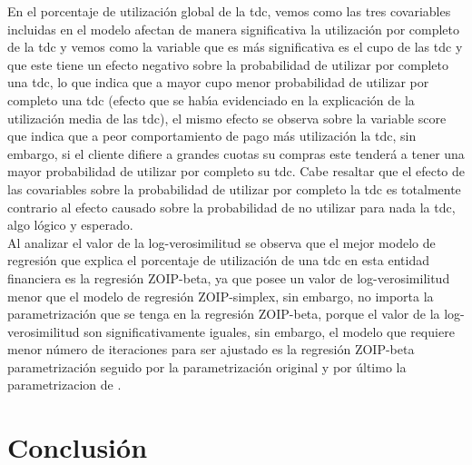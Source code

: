 En el porcentaje de utilizaci\'{o}n global de la tdc, vemos como las tres covariables incluidas en el modelo afectan de manera significativa la utilizaci\'{o}n por completo de la tdc y vemos como la variable que es m\'{a}s significativa es el cupo de las tdc y que este tiene un efecto negativo sobre la probabilidad de utilizar por completo una tdc, lo que indica que a mayor cupo menor probabilidad de utilizar por completo una tdc (efecto que se hab\'{\i}a evidenciado en la explicaci\'{o}n de la utilizaci\'{o}n media de las tdc), el mismo efecto se observa sobre la variable score que indica que a peor comportamiento de pago m\'{a}s utilizaci\'{o}n la tdc, sin embargo, si el cliente difiere a grandes cuotas su compras este tender\'{a} a tener una mayor probabilidad de utilizar por completo su tdc. Cabe resaltar que el efecto de las covariables sobre la probabilidad de utilizar por completo la tdc es totalmente contrario al efecto causado sobre la probabilidad de no utilizar para nada la tdc, algo l\'{o}gico y esperado.\\

Al analizar el valor de la log-verosimilitud se observa que el mejor modelo de regresi\'{o}n que explica el porcentaje de utilizaci\'{o}n de una tdc en esta entidad financiera es la regresi\'{o}n ZOIP-beta, ya que posee un valor de log-verosimilitud menor que el modelo de regresi\'{o}n ZOIP-simplex, sin embargo, no importa la parametrizaci\'{o}n que se tenga en la regresi\'{o}n ZOIP-beta, porque el valor de la log-verosimilitud son significativamente iguales, sin embargo, el modelo que requiere menor n\'{u}mero de iteraciones para ser ajustado es la regresi\'{o}n ZOIP-beta parametrizaci\'{o}n \cite{Ferrari2} seguido por la parametrizaci\'{o}n original y por \'{u}ltimo la parametrizacion de \cite{Stasinopoulos2}.



\section{Conclusi\'{o}n}

